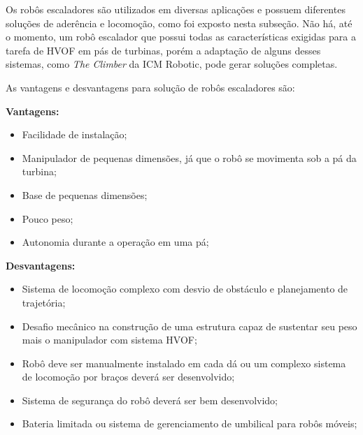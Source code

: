 Os robôs escaladores são utilizados em diversas aplicações e possuem diferentes
soluções de aderência e locomoção, como foi exposto nesta subseção. Não há,
até o momento, um robô escalador que possui todas as características
exigidas para a tarefa de HVOF em pás de turbinas, porém a adaptação de
alguns desses sistemas, como \emph{The Climber} da ICM Robotic, pode gerar
soluções completas.

As vantagens e desvantagens para solução de robôs escaladores são:

\textbf{Vantagens:}
\begin{itemize}
  \item Facilidade de instalação;
  \item Manipulador de pequenas dimensões, já que o robô se movimenta sob a pá
  da turbina;
  \item Base de pequenas dimensões;
  \item Pouco peso;
  \item Autonomia durante a operação em uma pá; 
\end{itemize}

\textbf{Desvantagens:}
\begin{itemize}
  \item Sistema de locomoção complexo com desvio de obstáculo e planejamento de
  trajetória;
  \item Desafio mecânico na construção de uma estrutura capaz de sustentar seu
  peso mais o manipulador com sistema HVOF;
  \item Robô deve ser manualmente instalado em cada dá ou um complexo sistema
  de locomoção por braços deverá ser desenvolvido;
  \item Sistema de segurança do robô deverá ser bem desenvolvido;
  \item Bateria limitada ou sistema de gerenciamento de umbilical para robôs
  móveis;
\end{itemize}